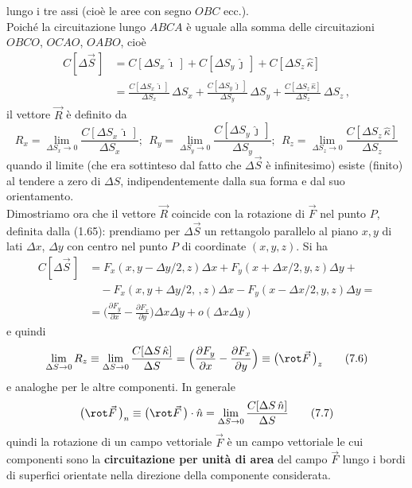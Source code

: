 lungo i tre assi (cio\`e le aree con segno $OBC$ ecc.).\\
Poich\'e la circuitazione lungo $ABCA$ \`e uguale alla somma delle circuitazioni
\ $OBCO$, $OCAO$, $OABO$, cio\`e
\begin{equation}
  \begin{aligned}
    C[\Delta\vec S\,]&=C[\Delta S_x\,\hat\imath\,]+C[\Delta S_y\,\hat\jmath\,]
    +C[\Delta S_z\,\hat\kappa]\\
    &=\frac{C[\Delta S_x\,\hat\imath\,]}{\Delta S_x}\,\Delta S_x
    +\frac{C[\Delta S_y\,\hat\jmath\,]}{\Delta S_y}\,\Delta S_y
    +\frac{C[\Delta S_z\,\hat\kappa]}{\Delta S_z}\,\Delta S_z\,,
  \end{aligned}
  \tag{7.3}
\end{equation}
il vettore $\vec R$ \`e definito da
\begin{equation}
  R_x=\lim_{\Delta S_x\to0}\frac{C[\Delta S_x\,\hat\imath\,]}{\Delta S_x};
  \ \ R_y=\lim_{\Delta S_y\to0}\frac{C[\Delta S_y\,\hat\jmath\,]}{\Delta S_y};
  \ \ R_z=\lim_{\Delta S_z\to0}\frac{C[\Delta S_z\,\hat\kappa]}{\Delta S_z}
  \tag{7.4}
\end{equation}
quando il limite (che era sottinteso dal fatto che $\Delta\vec S$ \`e
infinitesimo) esiste (finito) al tendere a zero di $\Delta S$, indipendentemente
dalla sua forma e dal suo orientamento.\\
Dimostriamo ora che il vettore $\vec R$ coincide con la rotazione di $\vec F$
nel punto $P$, definita dalla (1.65): prendiamo per $\Delta\vec S$ un rettangolo
parallelo al piano $x,y$ di lati $\Delta x$, $\Delta y$ con centro nel punto $P$
di coordinate $(x,y,z)$. Si ha
\begin{equation}
  \begin{aligned}
    C[\Delta\vec S\,]&=F_x(x,y-\Delta y/2,z)\Delta x
    +F_y(x+\Delta x/2,y,z)\Delta y+\\
    &\quad-F_x(x,y+\Delta y/2,\,,z)\Delta x-F_y(x-\Delta x/2,y,z)\Delta y=\\
    &=\Big(\frac{\partial F_y}{\partial x}-\frac{\partial F_x}{\partial y}\Big)
    \Delta x\Delta y+o(\Delta x\Delta y)
  \end{aligned}
  \tag{7.5}
\end{equation}
e quindi
\begin{equation}
  \lim_{\Delta S\to0}R_z\equiv\lim_{\Delta S\to0}
  \frac{C[\Delta S\,\hat\kappa]}{\Delta S}
  =\Big(\frac{\partial F_y}{\partial x}-\frac{\partial F_x}{\partial y}\Big)
  \equiv\big(\rot\vec F\,\big)_z
  \tag{7.6}
\end{equation}
e analoghe per le altre componenti. In generale
\begin{equation}
  \big(\rot\vec F\,\big)_n\equiv\big(\rot\vec F\,\big)\cdot\hat n
  =\lim_{\Delta S\to0}\frac{C[\Delta S\,\hat n]}{\Delta S}
  \tag{7.7}
\end{equation}
quindi la rotazione di un campo vettoriale $\vec F$ \`e un campo vettoriale le
cui componenti sono la \textbf{circuitazione per unit\`a di area} del campo
$\vec F$ lungo i bordi di superfici orientate nella direzione della componente
considerata.

